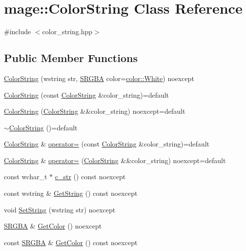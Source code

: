 \hypertarget{classmage_1_1_color_string}{}\section{mage\+:\+:Color\+String Class Reference}
\label{classmage_1_1_color_string}


{\ttfamily \#include $<$color\+\_\+string.\+hpp$>$}

\subsection*{Public Member Functions}
\begin{DoxyCompactItemize}
\item 
\hyperlink{classmage_1_1_color_string_a7bdfb4d0472d3a66edefab805b0b3dbf}{Color\+String} (wstring str, \hyperlink{structmage_1_1_s_r_g_b_a}{S\+R\+G\+BA} color=\hyperlink{namespacemage_1_1color_aecd3f854835fd8ac76f38a369ea539ed}{color\+::\+White}) noexcept
\item 
\hyperlink{classmage_1_1_color_string_aa878fda012b4149f673e905f6a8ea8b0}{Color\+String} (const \hyperlink{classmage_1_1_color_string}{Color\+String} \&color\+\_\+string)=default
\item 
\hyperlink{classmage_1_1_color_string_a47afe208490b4c93daaa755f468d860a}{Color\+String} (\hyperlink{classmage_1_1_color_string}{Color\+String} \&\&color\+\_\+string) noexcept=default
\item 
\hyperlink{classmage_1_1_color_string_a95886010269c8c4bc3a27fbfe829f4c2}{$\sim$\+Color\+String} ()=default
\item 
\hyperlink{classmage_1_1_color_string}{Color\+String} \& \hyperlink{classmage_1_1_color_string_a568fed43403422ecafdf92d04e11c4e5}{operator=} (const \hyperlink{classmage_1_1_color_string}{Color\+String} \&color\+\_\+string)=default
\item 
\hyperlink{classmage_1_1_color_string}{Color\+String} \& \hyperlink{classmage_1_1_color_string_aa909f18891bd31a23f2b7c877806bef1}{operator=} (\hyperlink{classmage_1_1_color_string}{Color\+String} \&\&color\+\_\+string) noexcept=default
\item 
const wchar\+\_\+t $\ast$ \hyperlink{classmage_1_1_color_string_af2241b81cac59051e9ebf0ddefe719ed}{c\+\_\+str} () const noexcept
\item 
const wstring \& \hyperlink{classmage_1_1_color_string_aee22268a2fe552320299dfa5ac5a93e1}{Get\+String} () const noexcept
\item 
void \hyperlink{classmage_1_1_color_string_ae735ab55789bb21741c6ad3c8115a146}{Set\+String} (wstring str) noexcept
\item 
\hyperlink{structmage_1_1_s_r_g_b_a}{S\+R\+G\+BA} \& \hyperlink{classmage_1_1_color_string_a524e8a66e94a353724c45728e3b73dc1}{Get\+Color} () noexcept
\item 
const \hyperlink{structmage_1_1_s_r_g_b_a}{S\+R\+G\+BA} \& \hyperlink{classmage_1_1_color_string_a51e959bf9ba68b767fe2b61655a9c7a9}{Get\+Color} () const noexcept
\end{DoxyCompactItemize}
